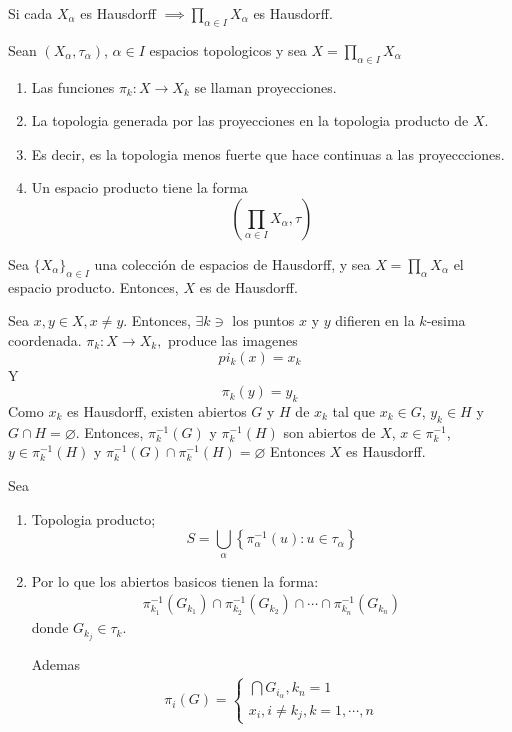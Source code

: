 \begin{cajita}
    Si cada $X_\alpha$ es Hausdorff $\implies \prod_{\alpha\in I}X_\alpha$ es Hausdorff. 
\end{cajita}

\begin{definicion}
    Sean $(X_\alpha,\tau_\alpha)$, $\alpha\in I$ espacios topologicos y sea $X=\prod_{\alpha\in I}X_\alpha$
    \begin{enumerate}
        \item Las funciones $\pi_k:X\to X_k$ se llaman proyecciones.
        \item La topologia generada por las proyecciones en la topologia producto de $X$. 
        \item Es decir, es la topologia menos fuerte que hace continuas a las proyeccciones. 
        \item Un espacio producto tiene la forma $$\left(\prod_{\alpha\in I} X_\alpha,\tau\right)$$
    \end{enumerate}
\end{definicion}

\begin{prop}
    Sea $\{X_\alpha\}_{\alpha\in I}$ una colección de espacios de Hausdorff, y sea $X=\prod_\alpha X_\alpha$ el espacio producto. Entonces, $X$ es de Hausdorff. 
    \begin{dem}
        Sea $x,y\in X, x\neq y$. Entonces, $\exists k\ni$ los puntos $x$ y $y$ difieren en la $k$-esima coordenada. 
        $\pi_k:X\to X_k,$ produce las imagenes 
        $$pi_k(x)=x_k$$
        Y
        $$\pi_k(y)=y_k$$
        Como $x_k$ es Hausdorff, existen abiertos $G$ y $H$ de $x_k$ tal que $x_k\in G$, $y_k\in H$ y $G\cap H=\varnothing$. Entonces, $\pi_k^{-1}(G)$ y $\pi_k^{-1}(H)$ son abiertos de $X$, $x\in \pi_{k}^{-1}$, $y\in \pi_k^{-1}(H)$ y $\pi_k^{-1}(G)\cap \pi_{k}^{-1}(H)=\varnothing$ Entonces $X$ es Hausdorff. 
    \end{dem}
\end{prop}

\begin{cajita}
    Sea 
    \begin{enumerate}
        \item Topologia producto;
        $$S=\bigcup_\alpha \left\{\pi_\alpha^{-1}(u):u\in \tau_\alpha\right\}$$
        \item Por lo que los abiertos basicos tienen la forma: 
        \begin{align*}
            \pi_{k_1}^{-1}\left(G_{k_1}\right)\cap \pi_{k_2}^{-1}\left(G_{k_2}\right)\cap \cdots \cap \pi_{k_n}^{-1}\left(G_{k_n}\right)
        \end{align*}
        donde $G_{k_j}\in \tau_k$. 

        Ademas
        \begin{align*}
            \pi_i(G) = \begin{cases}
                \bigcap G_{i_\alpha}, k_n=1\\
                x_i,i\neq k_j, k=1,\cdots, n
            \end{cases}
        \end{align*}
    \end{enumerate}
\end{cajita}

